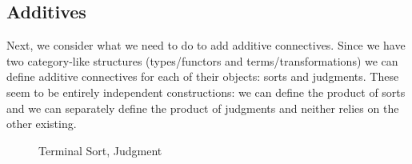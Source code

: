 \documentclass{article}
\begin{document}
\subsection{Additives}

Next, we consider what we need to do to add additive connectives.
%
Since we have two category-like structures (types/functors and
terms/transformations) we can define additive connectives for each of
their objects: sorts and judgments.
%
These seem to be entirely independent constructions: we can define the
product of sorts and we can separately define the product of judgments
and neither relies on the other existing.

\begin{figure}
  \caption{Terminal Sort, Judgment}
\end{figure}
\end{document}

